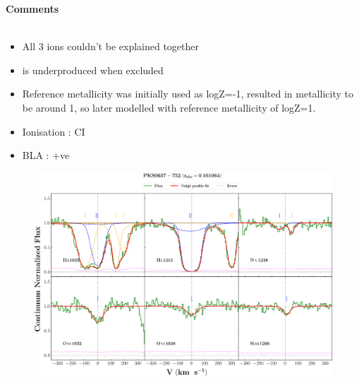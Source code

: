 \documentclass[12pt]{report}
\newcommand\ion[2]{\text{#1\,\textsc{\lowercase{#2}}}}
\begin{document}
\newpage

\textbf{Comments}
\\\\
\begin{itemize}
    \item All 3 ions couldn't be explained together
    \item \ion{O}{vi} is underproduced when excluded
    \item Reference metallicity was initially used as logZ=-1, resulted in metallicity to be around 1, so later modelled with reference metallicity of logZ=1. 
    \item Ionisation : CI
    \item BLA : +ve
\end{itemize}



\newpage


\begin{landscape}

    \begin{figure}
    \centering
    \vspace{-20mm}
    \hspace*{-35mm}
    \includegraphics[width=1.25\linewidth]{System-Plots/PKS0637-752_z=0.161064_sys_plot.png}
    \end{figure}
    
\end{landscape}
\end{document}
